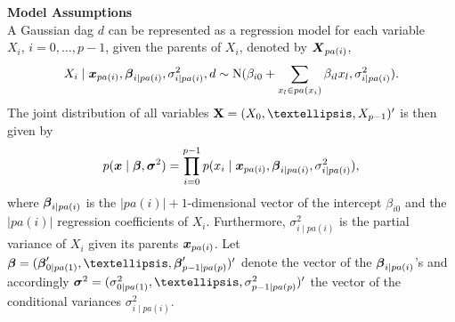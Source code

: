 \bigskip

{\bf Model Assumptions } \\[0.2cm]
 A Gaussian dag $d$ can be
represented as a regression model for each variable $X_i, \, i=0,
\dots, p-1$, given the parents of $X_i$, denoted by $\mbox{\boldmath $X$}_{pa(i)}$,
%
\begin{eqnarray}
X_i \mid \mbox{\boldmath $x$}_{pa(i)},  \mbox{\boldmath $\beta$}_{i \mid pa(i)}, \sigma_{i \mid
pa(i)}^2, d \sim  \mbox{N}(\beta_{i0} + \sum_{x_l \in pa(x_i)}
\beta_{il}x_l, \sigma_{i \mid pa(i)}^2). \nonumber
\end{eqnarray}
%
The joint distribution of all variables ${\bf X} = (X_0, \dots,
X_{p-1})'$ is then given by
%
\begin{eqnarray}
p(\mbox{\boldmath $x$} \mid  \mbox{\boldmath $\beta$}, \mbox{\boldmath $\sigma$}^2) = \prod_{i=0}^{p-1} p(x_i \mid
\mbox{\boldmath $x$}_{pa(i)}, \mbox{\boldmath $\beta$}_{i \mid pa(i)}, \sigma_{i \mid pa(i)}^2),
\nonumber
\end{eqnarray}
%
where $\mbox{\boldmath $\beta$}_{i \mid pa(i)}$ is the $|pa(i)|+1$-dimensional
vector of the intercept $\beta_{i0}$ and the $|pa(i)|$ regression
coefficients of $X_i$. Furthermore, $\sigma_{i \mid pa(i)}^2$ is
the partial variance of $X_i$ given its parents $\mbox{\boldmath $x$}_{pa(i)}$. Let
$\mbeta = (\mbeta'_{0 \mid pa(1)}, \dots, \mbeta'_{p-1 \mid
pa(p)})'$ denote the vector of the $\mbox{\boldmath $\beta$}_{i \mid pa(i)}$'s and
accordingly $\msigma^2 = (\sigma_{0 \mid pa(1)}^2, \dots,
\sigma_{p-1 \mid pa(p)}^2)'$ the vector of the conditional
variances $\sigma_{i \mid pa(i)}^2$.

\bigskip

